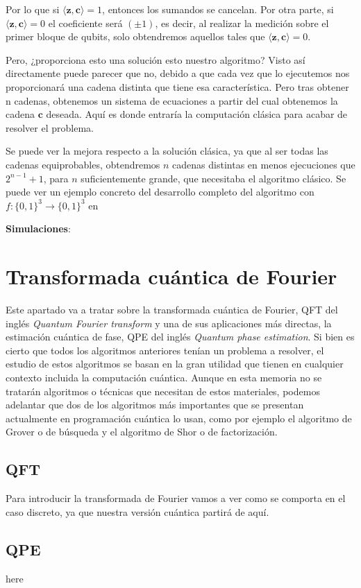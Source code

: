 Por lo que si $\langle \mathbf{z}, \mathbf{c}\rangle=1$, entonces los sumandos se cancelan. Por otra parte, si $\langle \mathbf{z}, \mathbf{c}\rangle=0$ el coeficiente será $(\pm 1)$, es decir, al realizar la medición sobre el primer bloque de qubits, solo obtendremos aquellos tales que $\langle \mathbf{z}, \mathbf{c}\rangle=0$. \newline

 Pero, ¿proporciona esto una solución esto nuestro algoritmo? Visto así directamente puede parecer que no, debido a que cada vez que lo ejecutemos nos proporcionará una cadena distinta que tiene esa característica. Pero tras obtener n cadenas, obtenemos un sistema de ecuaciones a partir del cual obtenemos la cadena $\mathbf{c}$ deseada. Aquí es donde entraría la computación clásica para acabar de resolver el problema.\newline

 Se puede ver la mejora respecto a la solución clásica, ya que al ser todas las cadenas equiprobables, obtendremos $n$ cadenas distintas en menos ejecuciones que $2^{n-1}+1$, para $n$ suficientemente grande, que necesitaba el algoritmo clásico. Se puede ver un ejemplo concreto del desarrollo completo del algoritmo con $f:\{0,1\}^{3} \rightarrow\{0,1\}^{3}$ en \citealp[\textit{Quantum computing for computer scientists, page 190}]{B:QuantumScientist:2008}

 \textbf{Simulaciones}:\newline
    
\section{Transformada cuántica de Fourier}
\label{Sec3.6:Fourier}

Este apartado va a tratar sobre la transformada cuántica de Fourier, QFT del inglés \textit{Quantum Fourier transform} y una de sus aplicaciones más directas, la estimación cuántica de fase, QPE del inglés \textit{Quantum phase estimation}. Si bien es cierto que todos los algoritmos anteriores tenían un problema a resolver, el estudio de estos algoritmos se basan en la gran utilidad que tienen en cualquier contexto incluida la computación cuántica. Aunque en esta memoria no se tratarán algoritmos o técnicas que necesitan de estos materiales, podemos adelantar que dos de los algoritmos más importantes que se presentan actualmente en programación cuántica lo usan, como por ejemplo el algoritmo de Grover o de búsqueda y el algoritmo de Shor o de factorización.

\subsection{QFT}
Para introducir la transformada de Fourier vamos a ver como se comporta en el caso discreto, ya que nuestra versión cuántica partirá de aquí. 

\subsection{QPE}
 here